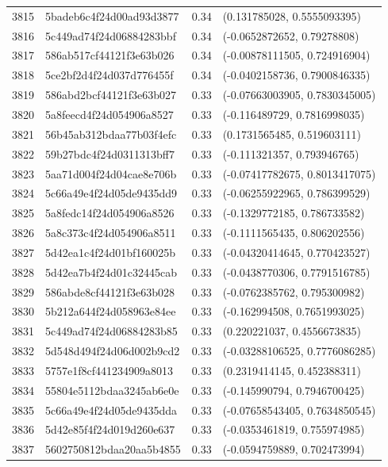 \begin{table}[ht]
\begin{tabular}{rlrl}
  3815 & 5badeb6c4f24d00ad93d3877 & 0.34 & (0.131785028, 0.5555093395) \\ 
  3816 & 5c449ad74f24d06884283bbf & 0.34 & (-0.0652872652, 0.79278808) \\ 
  3817 & 586ab517cf44121f3e63b026 & 0.34 & (-0.00878111505, 0.724916904) \\ 
  3818 & 5ce2bf2d4f24d037d776455f & 0.34 & (-0.0402158736, 0.7900846335) \\ 
  3819 & 586abd2bcf44121f3e63b027 & 0.33 & (-0.07663003905, 0.7830345005) \\ 
  3820 & 5a8feecd4f24d054906a8527 & 0.33 & (-0.116489729, 0.7816998035) \\ 
  3821 & 56b45ab312bdaa77b03f4efc & 0.33 & (0.1731565485, 0.519603111) \\ 
  3822 & 59b27bdc4f24d0311313bff7 & 0.33 & (-0.111321357, 0.793946765) \\ 
  3823 & 5aa71d004f24d04cae8e706b & 0.33 & (-0.07417782675, 0.8013417075) \\ 
  3824 & 5c66a49e4f24d05de9435dd9 & 0.33 & (-0.06255922965, 0.786399529) \\ 
  3825 & 5a8fedc14f24d054906a8526 & 0.33 & (-0.1329772185, 0.786733582) \\ 
  3826 & 5a8c373c4f24d054906a8511 & 0.33 & (-0.1111565435, 0.806202556) \\ 
  3827 & 5d42ea1c4f24d01bf160025b & 0.33 & (-0.04320414645, 0.770423527) \\ 
  3828 & 5d42ea7b4f24d01c32445cab & 0.33 & (-0.0438770306, 0.7791516785) \\ 
  3829 & 586abde8cf44121f3e63b028 & 0.33 & (-0.0762385762, 0.795300982) \\ 
  3830 & 5b212a644f24d058963e84ee & 0.33 & (-0.162994508, 0.7651993025) \\ 
  3831 & 5c449ad74f24d06884283b85 & 0.33 & (0.220221037, 0.4556673835) \\ 
  3832 & 5d548d494f24d06d002b9cd2 & 0.33 & (-0.03288106525, 0.7776086285) \\ 
  3833 & 5757e1f8cf441234909a8013 & 0.33 & (0.2319414145, 0.452388311) \\ 
  3834 & 55804e5112bdaa3245ab6e0e & 0.33 & (-0.145990794, 0.7946700425) \\ 
  3835 & 5c66a49e4f24d05de9435dda & 0.33 & (-0.07658543405, 0.7634850545) \\ 
  3836 & 5d42e85f4f24d019d260e637 & 0.33 & (-0.0353461819, 0.755974985) \\ 
  3837 & 5602750812bdaa20aa5b4855 & 0.33 & (-0.0594759889, 0.702473994) \\ 

\end{tabular}
\end{table}
